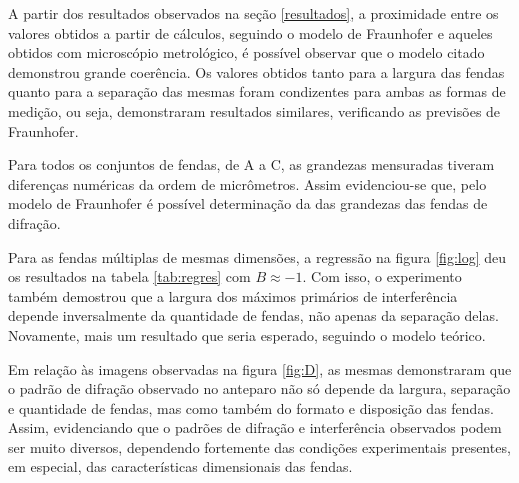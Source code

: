 A partir dos resultados observados na seção \ref{resultados}, a proximidade entre os valores obtidos a partir de cálculos, seguindo o modelo de Fraunhofer e aqueles obtidos com microscópio metrológico, é possível observar que o modelo citado demonstrou grande coerência. Os valores obtidos tanto para a largura das fendas quanto para a separação das mesmas foram condizentes para ambas as formas de medição, ou seja, demonstraram resultados similares, verificando as previsões de Fraunhofer.

Para todos os conjuntos de fendas, de A a C, as grandezas mensuradas tiveram diferenças numéricas da ordem de micrômetros. Assim evidenciou-se que, pelo modelo de Fraunhofer é possível determinação da das grandezas das fendas de difração.

Para as fendas múltiplas de mesmas dimensões, a regressão na figura \ref{fig:log} deu os resultados na tabela \ref{tab:regres} com $B \approx -1$. Com isso, o experimento também demostrou que a largura dos máximos primários de interferência depende inversalmente da quantidade de fendas, não apenas da separação delas. Novamente, mais um resultado que seria esperado, seguindo o modelo teórico.

Em relação às imagens observadas na figura \ref{fig:D}, as mesmas demonstraram que o padrão de difração observado no anteparo não só depende da largura, separação e quantidade de fendas, mas como também do formato e disposição das fendas. Assim, evidenciando que o padrões de difração e interferência observados podem ser muito diversos, dependendo fortemente das condições experimentais presentes, em especial, das características dimensionais das fendas.

